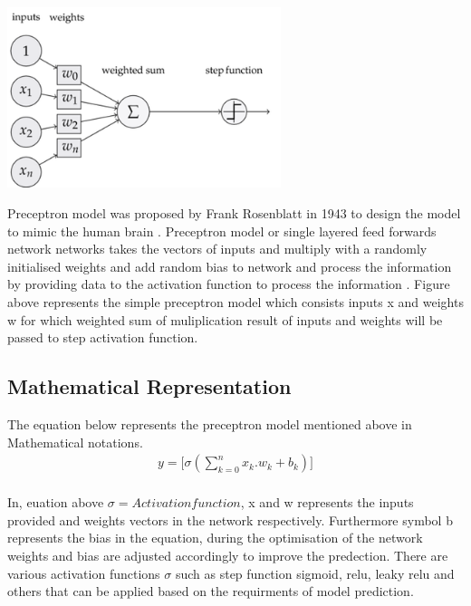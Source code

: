 
\begin{center}
    \includegraphics[width=0.6\textwidth]{Images/p_model.png} \\
\end{center}
\vspace{2mm}
Preceptron model was proposed by Frank Rosenblatt in 1943 to design the model to 
mimic the human brain \citep{939589}. Preceptron model or single layered feed forwards network 
networks takes the vectors of inputs and multiply with a randomly 
initialised weights and add random bias to network and process the information by providing data to the
activation function to process the information \citep{AGATONOVICKUSTRIN2000717}.
Figure above represents the simple preceptron model which consists inputs x and weights w 
for which weighted sum of muliplication result of 
inputs and weights will be passed to step activation function.

\subsection{Mathematical Representation }
\vspace{3mm}
{The equation below represents the preceptron model mentioned above in Mathematical notations.}
\begin{equation}
    \begin{split}
        y = \Big[\sigma(\sum_{k=0}^n x_k.w_k + b_k)\Big] \\
    \end{split}
\end{equation}

     {
        In, euation above ${\sigma = Activation function}$, x and w represents the inputs provided 
        and weights vectors in the network respectively. Furthermore symbol b represents the  bias in the equation, 
        during the optimisation of the network weights and bias are adjusted accordingly to improve the 
        predection. There are various activation functions ${\sigma}$ such as  step function sigmoid, 
        relu, leaky relu and others that can be applied based on the requirments of model prediction.
    }